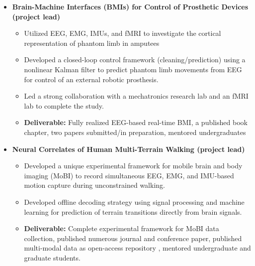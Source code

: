 \begin{adjustwidth}{0.5em}{0pt}
    \begin{itemize}
    \item[\color{accent}\ding{224}] {\color{emphasis}\textbf{Brain-Machine Interfaces (BMIs) for Control of Prosthetic Devices (project lead) ~~}}\\
    \smallskip
        \begin{itemize}
            \item Utilized EEG, EMG, IMUs, and fMRI to investigate the cortical representation of phantom limb in amputees 
            \item Developed a closed-loop control framework (cleaning/prediction) using a nonlinear Kalman filter to predict phantom limb movements from EEG for control of an external robotic prosthesis. 
            \item Led a strong collaboration with a mechatronics research lab and an fMRI lab to complete the study. 
            \item {\color{pink} \textbf{Deliverable:}} Fully realized EEG-based real-time BMI, a published book chapter, two papers submitted/in preparation, mentored undergraduates
        \end{itemize}
    \medskip    
    
    \item[\color{accent}\ding{224}] {\color{emphasis}\textbf{Neural Correlates of Human Multi-Terrain Walking (project lead) \hspace{10pt} }}\\
    \smallskip
        \begin{itemize}
            \item Developed a unique experimental framework for mobile brain and body imaging (MoBI) to record simultaneous EEG, EMG, and IMU-based motion capture during unconstrained walking.
            \item Developed offline decoding strategy using signal processing and machine learning for prediction of terrain transitions directly from brain signals.
            \item {\color{pink} \textbf{Deliverable:}} Complete experimental framework for MoBI data collection, published numerous journal and conference paper, published multi-modal data as open-access repository \href{https://figshare.com/articles/EEG_Data/5616109/5}{\faFloppyO}, mentored undergraduate and graduate students.
        \end{itemize}
    \medskip   
    

\end{itemize}
\end{adjustwidth}
